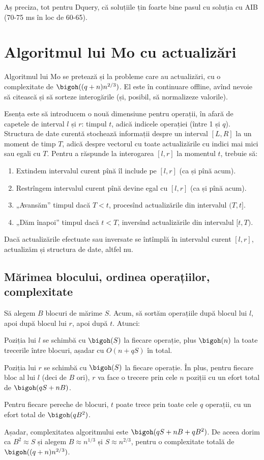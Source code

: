 Aș preciza, tot pentru Dquery, că soluțiile țin foarte bine pasul cu soluția cu AIB (70-75 ms în loc de 60-65).

\section{Algoritmul lui Mo cu actualizări}

Algoritmul lui Mo se pretează și la probleme care au actualizări, cu o complexitate de $\bigoh((q + n) n^{2/3})$. El este în continuare offline, avînd nevoie să citească și să sorteze interogările (și, posibil, să normalizeze valorile).

Esența este să introducem o nouă dimensiune pentru operații, în afară de capetele de interval $l$ și $r$: timpul $t$, adică indicele operației (între 1 și $q$). Structura de date curentă stochează informații despre un interval $[L,R]$ la un moment de timp $T$, adică despre vectorul cu toate actualizările cu indici mai mici sau egali cu $T$. Pentru a răspunde la interogarea $[l,r]$ la momentul $t$, trebuie să:

\begin{enumerate}
  \item Extindem intervalul curent pînă îl include pe $[l,r]$ (ca și pînă acum).
  \item Restrîngem intervalul curent pînă devine egal cu $[l,r]$ (ca și pînă acum).
  \item „Avansăm” timpul dacă $T < t$, procesînd actualizările din intervalul $(T, t]$.
  \item „Dăm înapoi” timpul dacă $t < T$, inversînd actualizările din intervalul $[t, T)$.
\end{enumerate}

Dacă actualizările efectuate sau inversate se întîmplă în intervalul curent $[l,r]$, actualizăm și structura de date, altfel nu.

\subsection{Mărimea blocului, ordinea operațiilor, complexitate}

Să alegem $B$ blocuri de mărime $S$. Acum, să sortăm operațiile după blocul lui $l$, apoi după blocul lui $r$, apoi după $t$. Atunci:

Poziția lui $l$ se schimbă cu $\bigoh(S)$ la fiecare operație, plus $\bigoh(n)$ la toate trecerile între blocuri, așadar cu $O(n + qS)$ în total.

Poziția lui $r$ se schimbă cu $\bigoh(S)$ la fiecare operație. În plus, pentru fiecare bloc al lui $l$ (deci de $B$ ori), $r$ va face o trecere prin cele $n$ poziții cu un efort total de $\bigoh(qS + nB)$.

Pentru fiecare pereche de blocuri, $t$ poate trece prin toate cele $q$ operații, cu un efort total de $\bigoh(qB^2)$.

Așadar, complexitatea algoritmului este $\bigoh(qS + nB + qB^2)$. De aceea dorim ca $B^2 \approx S$ și alegem $B \approx n^{1/3}$ și $S \approx n^{2/3}$, pentru o complexitate totală de $\bigoh((q + n)n^{2/3})$.
